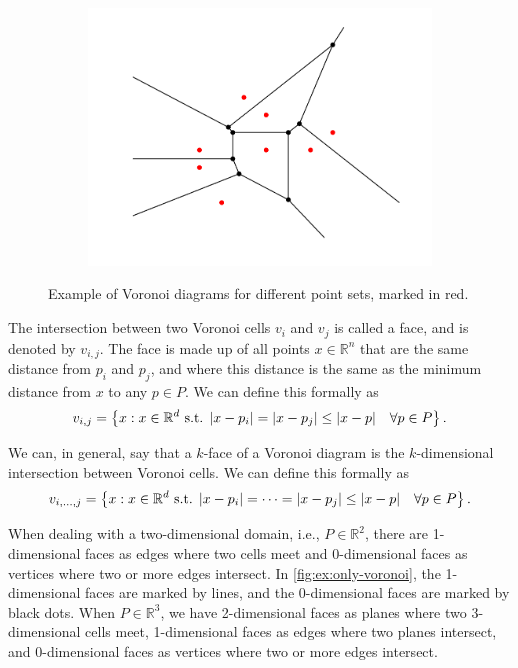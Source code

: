 \begin{figure}[ht]
\begin{subfigure}[b]{0.3\textwidth}
        \includegraphics[width=\textwidth]{report/Images/Theory/voronoi/voronoi_example3.png}
    \end{subfigure}
    \caption[Example of Voronoi diagrams]{Example of Voronoi diagrams for different point sets, marked in red.}
    \label{fig:ex:only-voronoi}
\end{figure}

The intersection between two Voronoi cells $v_i$ and $v_j$ is called a face, and is denoted by $v_{i,j}$. The face is made up of all points $x \in \mathbb{R}^n$ that are the same distance from $p_i$ and $p_j$, and where this distance is the same as the minimum distance from $x$ to any $p \in P$. We can define this formally as
\begin{equation}
\label{eq:voronoi-face}
    v_{i, j} = \left\{ x : x \in \mathbb{R}^d \text{ s.t. } \lvert x - p_i\rvert = \lvert x - p_j\rvert \leq \lvert x - p\rvert\quad \forall p \in P \right\}.
\end{equation}

We can, in general, say that a $k$-face of a Voronoi diagram is the $k$-dimensional intersection between Voronoi cells. We can define this formally as
\begin{equation}
\label{eq:voronoi-k-faces}
    v_{i,\dots, j} = \left\{ x : x \in \mathbb{R}^d \text{ s.t. } \lvert x - p_i\rvert = \dots = \lvert x - p_j\rvert \leq \lvert x - p\rvert\quad \forall p \in P \right\}.
\end{equation}

When dealing with a two-dimensional domain, i.e., $P \in \mathbb{R}^2$, there are 1-dimensional faces as edges where two cells meet and 0-dimensional faces as vertices where two or more edges intersect. In \autoref{fig:ex:only-voronoi}, the 1-dimensional faces are marked by lines, and the 0-dimensional faces are marked by black dots. When $P \in \mathbb{R}^3$, we have 2-dimensional faces as planes where two 3-dimensional cells meet, 1-dimensional faces as edges where two planes intersect, and 0-dimensional faces as vertices where two or more edges intersect.

